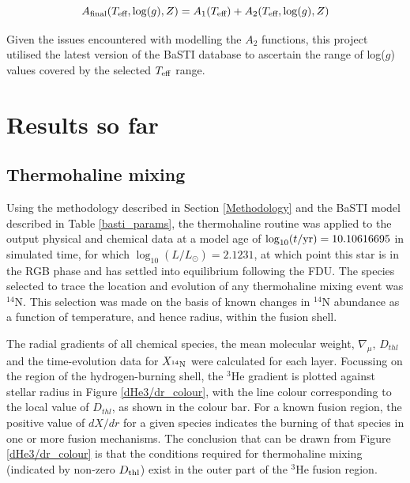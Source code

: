 \documentclass[12pt, a4paper]{report}
\begin{document}
\begin{equation}
A_{\textnormal{final}}(T_{\textnormal{eff}},\log(g),Z) = A_{1}(T_{\textnormal{eff}}) + A_{2}(T_{\textnormal{eff}},\log(g),Z)
\label{Afinal}
\end{equation}

Given the issues encountered with modelling the $A_{2}$ functions, this project utilised the latest version of the BaSTI database \citep{2018ApJ...856..125H} to ascertain the range of log($g$) values covered by the selected $T_{\textnormal{eff}}$ range.

\chapter{Results so far}
\section{Thermohaline mixing}
Using the methodology described in Section \ref{Methodology} and the BaSTI model described in Table \ref{basti_params}, the thermohaline routine was applied to the output physical and chemical data at a model age of $\log_{10}(t/\textnormal{yr}) = 10.10616695$ in simulated time, for which $\log_{10}(L/L_{\odot}) = 2.1231$, at which point this star is in the RGB phase and has settled into equilibrium following the FDU. The species selected to trace the location and evolution of any thermohaline mixing event was $^{14}$N. This selection was made on the basis of known changes in $^{14}$N abundance as a function of temperature, and hence radius, within the fusion shell.

The radial gradients of all chemical species, the mean molecular weight, $\nabla_{\mu}$,  $D_{thl}$ and the time-evolution data for $X_{^{14}\textnormal{N}}$ were calculated for each layer. Focussing on the region of the hydrogen-burning shell, the $^{3}$He gradient is plotted against stellar radius in Figure \ref{dHe3/dr_colour}, with the line colour corresponding to the local value of $D_{thl}$, as shown in the colour bar. For a known fusion region, the positive value of $dX/dr$ for a given species indicates the burning of that species in one or more fusion mechanisms. The conclusion that can be drawn from Figure \ref{dHe3/dr_colour} is that the conditions required for thermohaline mixing (indicated by non-zero $D_{\textnormal{thl}}$) exist in the outer part of the $^{3}$He fusion region.
\end{document}
